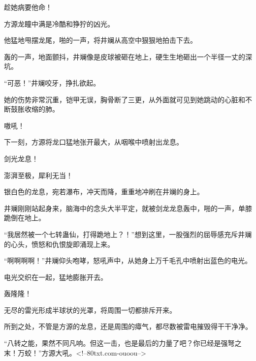 \begin{this_body}
趁她病要他命！

方源龙瞳中满是冷酷和狰狞的凶光。

他猛地甩摆龙尾，啪的一声，将井斓从高空中狠狠地拍击下去。

轰的一声，地面颤抖，井斓像是皮球被砸在地上，硬生生地砸出一个半径一丈的深坑。

“可恶！”井斓咬牙，挣扎欲起。

她的伤势非常沉重，铠甲无误，胸骨断了三更，从外面就可见到她跳动的心脏和不断鼓胀收缩的肺。

嗷吼！

下一刻，方源将龙口猛地张开最大，从咽喉中喷射出龙息。

剑光龙息！

澎湃至极，犀利无当！

银白色的龙息，宛若瀑布，冲天而降，重重地冲刷在井斓的身上。

井斓刚刚站起身来，脑海中的念头大半平定，就被剑龙龙息轰中，啪的一声，单膝跪倒在地上。

“我居然被一个七转蛊仙，打得跪地上？！”想到这里，一股强烈的屈辱感充斥井斓的心头，愤怒和仇恨旋即涌现上来。

“啊啊啊啊！”井斓仰头咆哮，怒吼声中，从她身上万千毛孔中喷射出蓝色的电光。

电光交织在一起，猛地膨胀开去。

轰隆隆！

无尽的雷光形成半球状的光罩，将周围一切都排斥开来。

所到之处，不管是方源的龙息，还是周围的瘴气，都尽数被雷电摧毁得干干净净。

“八转之能，果然不同凡响。但这一击，也是最后的力量了吧？你已经是强弩之末！万蛟！”方源大吼。<!--80txt.com-ouoou-->

\end{this_body}

